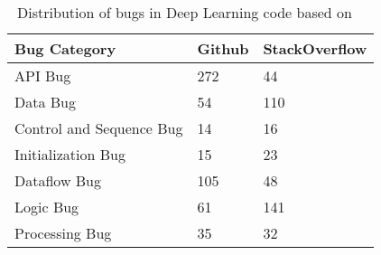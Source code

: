 \begin{table}[h!]
\centering
     \caption{Distribution of bugs in Deep Learning code based on ~\cite{islam2019comprehensive}}
    \label{tab:dl_bug}
\begin{tabular}{lll}
Bug Category             & Github & StackOverflow \\ \hline
API Bug                  & 272    & 44            \\
Data Bug                 & 54     & 110           \\
Control and Sequence Bug & 14     & 16            \\
Initialization Bug       & 15     & 23            \\
Dataflow Bug             & 105    & 48            \\
Logic Bug                & 61     & 141           \\
Processing Bug           & 35     & 32           
\end{tabular}
\end{table}